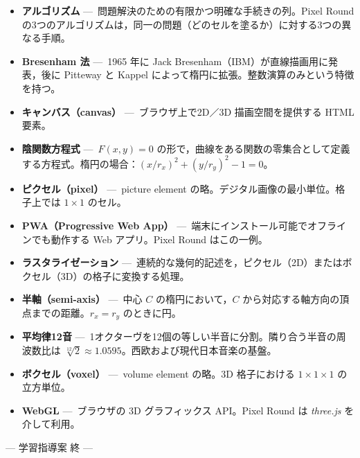 \documentclass[12pt,a4paper]{scrartcl}
\newcommand{\acc}[1]{\textcolor{accent}{\textbf{#1}}}
\begin{document}
\begin{itemize}[leftmargin=1.4em,itemsep=0.3em,topsep=0.3em]
  \item \acc{アルゴリズム} ---\, 問題解決のための有限かつ明確な手続きの列。Pixel Round の3つのアルゴリズムは，同一の問題（どのセルを塗るか）に対する3つの異なる手順。
  \item \acc{Bresenham 法} ---\, 1965 年に Jack Bresenham（IBM）が直線描画用に発表，後に Pitteway と Kappel によって楕円に拡張。整数演算のみという特徴を持つ。
  \item \acc{キャンバス（canvas）} ---\, ブラウザ上で2D／3D 描画空間を提供する HTML 要素。
  \item \acc{陰関数方程式} ---\, $F(x, y) = 0$ の形で，曲線をある関数の零集合として定義する方程式。楕円の場合：$(x/r_x)^2 + (y/r_y)^2 - 1 = 0$。
  \item \acc{ピクセル（pixel）} ---\, picture element の略。デジタル画像の最小単位。格子上では $1 \times 1$ のセル。
  \item \acc{PWA（Progressive Web App）} ---\, 端末にインストール可能でオフラインでも動作する Web アプリ。Pixel Round はこの一例。
  \item \acc{ラスタライゼーション} ---\, 連続的な幾何的記述を，ピクセル（2D）またはボクセル（3D）の格子に変換する処理。
  \item \acc{半軸（semi-axis）} ---\, 中心 $C$ の楕円において，$C$ から対応する軸方向の頂点までの距離。$r_x = r_y$ のときに円。
  \item \acc{平均律12音} ---\, 1オクターヴを12個の等しい半音に分割。隣り合う半音の周波数比は $\sqrt[12]{2} \approx 1.0595$。西欧および現代日本音楽の基盤。
  \item \acc{ボクセル（voxel）} ---\, volume element の略。3D 格子における $1 \times 1 \times 1$ の立方単位。
  \item \acc{WebGL} ---\, ブラウザの 3D グラフィックス API。Pixel Round は \emph{three.js} を介して利用。
\end{itemize}

\vspace{2em}
\begin{center}
\color{muted}\small\sffamily
--- 学習指導案 終 ---
\end{center}
\end{document}
